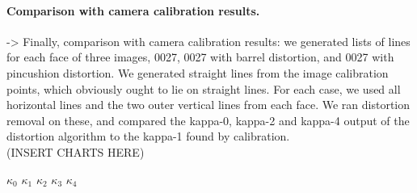 \paragraph{Comparison with camera calibration results.}

-> Finally, comparison with camera calibration results: we generated lists of lines for each face of three images, 0027, 0027 with barrel distortion, and 0027 with pincushion distortion. We generated straight lines from the image calibration points, which obviously ought to lie on straight lines. For each case, we used all horizontal lines and the two outer vertical lines from each face. We ran distortion removal on these, and compared the kappa-0, kappa-2 and kappa-4 output of the distortion algorithm to the kappa-1 found by calibration.\\

(INSERT CHARTS HERE)



 $ \kappa_{0}$
 $ \kappa_{1}$
 $ \kappa_{2}$
 $ \kappa_{3}$
 $ \kappa_{4}$






